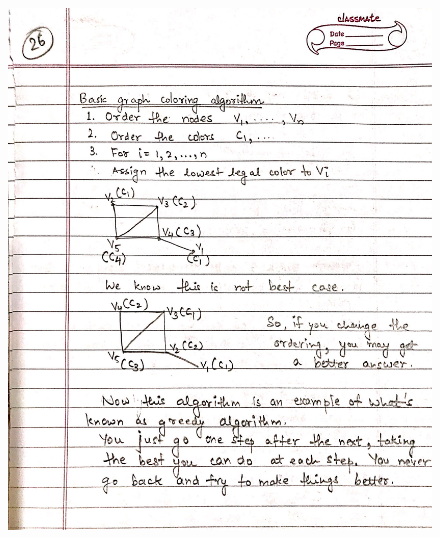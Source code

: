 \begin{figure}[H]
    \centering
    \includegraphics[scale=0.25]{"./MIT-6.042J/MIT-6042J-026"}
\end{figure}
\newpage
